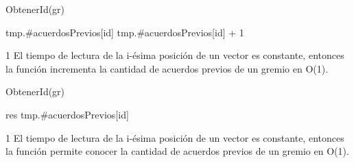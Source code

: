 {
	\state {} \asig ObtenerId(gr)											

	\state tmp.\#acuerdosPrevios[id] \asig tmp.\#acuerdosPrevios[id] + 1					
}
{1}
{ El tiempo de lectura de la i-ésima posición de un vector es constante, entonces la función incrementa la cantidad de acuerdos previos de un gremio en O(1). }

{
	\state {} \asig ObtenerId(gr)			

	\state res \asig tmp.\#acuerdosPrevios[id]					
}
{1}
{ El tiempo de lectura de la i-ésima posición de un vector es constante, entonces la función permite conocer la cantidad de acuerdos previos de un gremio en O(1). }